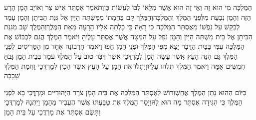 \documentclass[../main/main.tex]{subfiles}
\begin{document}
\begin{multicols*}{\ncols}
הַמַּלְכָּה מִי הוּא זֶה וְאֵי זֶה הוּא אֲשֶׁר מְלָאוֹ לִבּוֹ לַעֲשׂוֹת כֵּן\PreVerseSpace{}וַתֹּאמֶר אֶסְתֵּר אִישׁ צַר וְאוֹיֵב הָמָן הָרָע הַזֶּה וְהָמָן נִבְעַת מִלִּפְנֵי הַמֶּלֶךְ וְהַמַּלְכָּה\PreVerseSpace{}וְהַמֶּלֶךְ קָם בַּחֲמָתוֹ מִמִּשְׁתֵּה הַיַּיִן אֶל גִּנַּת הַבִּיתָן וְהָמָן עָמַד לְבַקֵּשׁ עַל נַפְשׁוֹ מֵאֶסְתֵּר הַמַּלְכָּה כִּי רָאָה כִּי כָלְתָה אֵלָיו הָרָעָה מֵאֵת הַמֶּלֶךְ\PreVerseSpace{}וְהַמֶּלֶךְ שָׁב מִגִּנַּת הַבִּיתָן אֶל בֵּית מִשְׁתֵּה הַיַּיִן וְהָמָן נֹפֵל עַל הַמִּטָּה אֲשֶׁר אֶסְתֵּר עָלֶיהָ וַיֹּאמֶר הַמֶּלֶךְ הֲגַם לִכְבּוֹשׁ אֶת הַמַּלְכָּה עִמִּי בַּבָּיִת הַדָּבָר יָצָא מִפִּי הַמֶּלֶךְ וּפְנֵי הָמָן חָפוּ \ClosedSection{}וַיֹּאמֶר חַרְבוֹנָה אֶחָד מִן הַסָּרִיסִים לִפְנֵי הַמֶּלֶךְ גַּם הִנֵּה הָעֵץ אֲשֶׁר עָשָׂה הָמָן לְמָרְדֳּכַי אֲשֶׁר דִּבֶּר טוֹב עַל הַמֶּלֶךְ עֹמֵד בְּבֵית הָמָן גָּבֹהַּ חֲמִשִּׁים אַמָּה וַיֹּאמֶר הַמֶּלֶךְ תְּלֻהוּ עָלָיו\PreVerseSpace{}וַיִּתְלוּ אֶת הָמָן עַל הָעֵץ אֲשֶׁר הֵכִין לְמָרְדֳּכָי וַחֲמַת הַמֶּלֶךְ שָׁכָכָה\OpenSection{}\par
{}בַּיּוֹם הַהוּא נָתַן הַמֶּלֶךְ אֲחַשְׁוֵרוֹשׁ לְאֶסְתֵּר הַמַּלְכָּה אֶת בֵּית הָמָן צֹרֵר הַיְּהוּדִיּים וּמָרְדֳּכַי בָּא לִפְנֵי הַמֶּלֶךְ כִּי הִגִּידָה אֶסְתֵּר מַה הוּא לָהּ\PreVerseSpace{}וַיָּסַר הַמֶּלֶךְ אֶת טַבַּעְתּוֹ אֲשֶׁר הֶעֱבִיר מֵהָמָן וַיִּתְּנָהּ לְמָרְדֳּכָי וַתָּשֶׂם אֶסְתֵּר אֶת מָרְדֳּכַי עַל בֵּית הָמָן\OpenSection{}\par

\end{multicols*}
\end{document}
